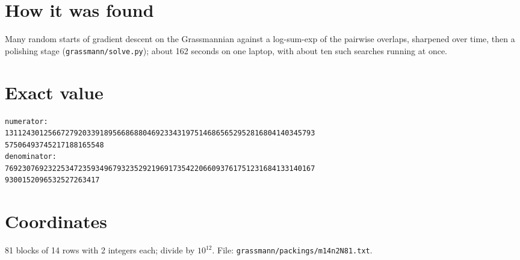 \documentclass[11pt,a4paper]{article}
\begin{document}
\section{How it was found}
Many random starts of gradient descent on the Grassmannian against a log-sum-exp of the pairwise overlaps, sharpened over time, then a polishing stage (\texttt{grassmann/solve.py}); about 162 seconds on one laptop, with about ten such searches running at once.


\appendix
\section{Exact value}
{\small
\begin{verbatim}
numerator:
131124301256672792033918956686880469233431975146865652952816804140345793
57506493745217188165548
denominator:
769230769232253472359349679323529219691735422066093761751231684133140167
9300152096532527263417
\end{verbatim}}

\section{Coordinates}
81 blocks of 14 rows with 2 integers each; divide by $10^{12}$. File: \texttt{grassmann/packings/m14n2N81.txt}.
{\tiny
\begin{multicols}{4}
\end{multicols}}
\end{document}
